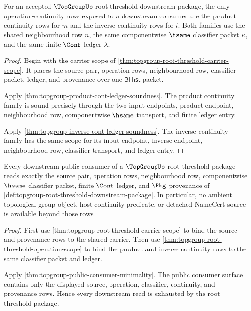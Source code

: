 \begin{theorem}
\label{thm:topgroup-root-threshold-operation-scope}
For an accepted $\TopGroupUp$ root threshold downstream package, the only
operation-continuity rows exposed to a downstream consumer are the product
continuity rows for $m$ and the inverse continuity rows for $i$. Both
families use the shared neighbourhood row $n$, the same componentwise
$\hsame$ classifier packet $\kappa$, and the same finite $\Cont$ ledger
$\lambda$.
\end{theorem}
\begin{proof}
Begin with the carrier scope of
\autoref{thm:topgroup-root-threshold-carrier-scope}. It places the source
pair, operation rows, neighbourhood row, classifier packet, ledger, and
provenance over one $\mathsf{BHist}$ packet.

Apply \autoref{thm:topgroup-product-cont-ledger-soundness}. The product
continuity family is sound precisely through the two input endpoints, product
endpoint, neighbourhood row, componentwise $\hsame$ transport, and finite
ledger entry.

Apply \autoref{thm:topgroup-inverse-cont-ledger-soundness}. The inverse
continuity family has the same scope for its input endpoint, inverse endpoint,
neighbourhood row, classifier transport, and ledger entry.
\end{proof}

\begin{theorem}
\label{thm:topgroup-root-threshold-consumer-exhaustion}
Every downstream public consumer of a $\TopGroupUp$ root threshold package
reads exactly the source pair, operation rows, neighbourhood row,
componentwise $\hsame$ classifier packet, finite $\Cont$ ledger, and
$\Pkg$ provenance of
\autoref{def:topgroup-root-threshold-downstream-package}. In particular, no
ambient topological-group object, host continuity predicate, or detached
NameCert source is available beyond those rows.
\end{theorem}
\begin{proof}
First use \autoref{thm:topgroup-root-threshold-carrier-scope} to bind the
source and provenance rows to the shared carrier. Then use
\autoref{thm:topgroup-root-threshold-operation-scope} to bind the product and
inverse continuity rows to the same classifier packet and ledger.

Apply \autoref{thm:topgroup-public-consumer-minimality}. The public consumer
surface contains only the displayed source, operation, classifier,
continuity, and provenance rows. Hence every downstream read is exhausted by
the root threshold package.
\end{proof}

